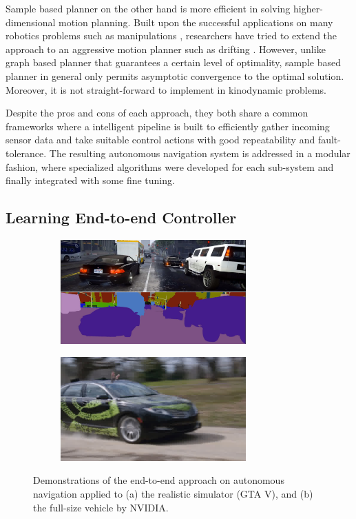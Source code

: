 \documentclass[../thesis.tex]{subfiles}
\begin{document}
Sample based planner on the other hand is more efficient in solving higher-dimensional motion planning. 
Built upon the successful applications on many robotics problems such as manipulations \cite{kuffner2000rrt}, researchers have tried to extend the approach to an aggressive motion planner such as drifting \cite{hwan2011anytime}. 
However, unlike graph based planner that guarantees a certain level of optimality, sample based planner in general only permits asymptotic convergence to the optimal solution. Moreover, it is not straight-forward to implement in kinodynamic problems.


Despite the pros and cons of each approach, they both share a common frameworks where a intelligent pipeline is built to efficiently gather incoming sensor data and take suitable control actions with good repeatability and fault-tolerance. 
The resulting autonomous navigation system is addressed in a modular fashion, where specialized algorithms were developed for each sub-system and finally integrated with some fine tuning.


\subsection{Learning End-to-end Controller}

\begin{figure}[b]
    \centering
    \begin{subfigure}[b]{0.45\linewidth}
        \includegraphics[height=4cm]{./Introduction/fig/gta.jpg}
    \end{subfigure}
    \begin{subfigure}[b]{0.45\linewidth}
        \includegraphics[height=4cm]{./Introduction/fig/nvidia.jpg}
    \end{subfigure}
    \caption{Demonstrations of the end-to-end approach on autonomous navigation applied to (a) the realistic simulator (GTA V), and (b) the full-size vehicle by NVIDIA\cite{nvidiacar}.}
    \label{fig:end-to-end}
\end{figure}
\end{document}
